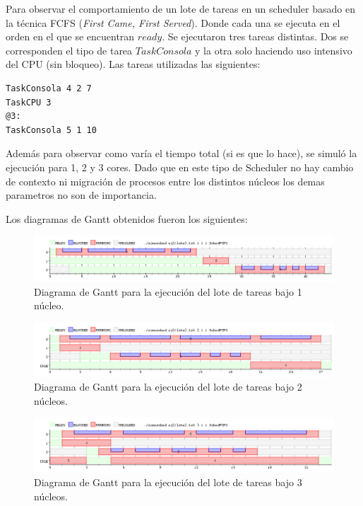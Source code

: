 \documentclass[a4paper]{article}
\begin{document}
Para observar el comportamiento de un lote de tareas en un scheduler basado en la técnica FCFS
(\textit{First Came, First Served}). Donde cada una se ejecuta en el orden en el que se encuentran $ready$. Se ejecutaron tres tareas distintas. Dos se corresponden el tipo de tarea $TaskConsola$ y la otra solo haciendo uso intensivo del CPU (sin bloqueo). Las tareas utilizadas las siguientes:
	\begin{codesnippet}
	\begin{verbatim}
TaskConsola 4 2 7
TaskCPU 3
@3:
TaskConsola 5 1 10
	\end{verbatim}
	\end{codesnippet}
	
Además para observar como varía el tiempo total (si es que lo hace), se simuló la ejecución para 1, 2 y 3 cores. Dado que en este tipo de Scheduler no hay cambio de contexto ni migración de procesos entre los distintos núcleos los demas parametros no son de importancia.

Los diagramas de Gantt obtenidos fueron los siguientes:\\

 \begin{figure}[h!]
   \begin{center}
 	\includegraphics[scale=0.5]{imagenes/ej2/1core.png}
 	\caption{Diagrama de Gantt para la ejecuci\'on del lote de tareas bajo 1 n\'ucleo.}
   \end{center}
 \end{figure} 
 

 \begin{figure}[h!]
   \begin{center}
 	\includegraphics[scale=0.5]{imagenes/ej2/2core.png}
 	\caption{Diagrama de Gantt para la ejecuci\'on del lote de tareas bajo 2 n\'ucleos.}
   \end{center}
 \end{figure} 
 
  \newpage

  \begin{figure}[h!]
   \begin{center}
 	\includegraphics[scale=0.5]{imagenes/ej2/3core.png}
 	\caption{Diagrama de Gantt para la ejecuci\'on del lote de tareas bajo 3 n\'ucleos.}
   \end{center}
 \end{figure} 
\end{document}
